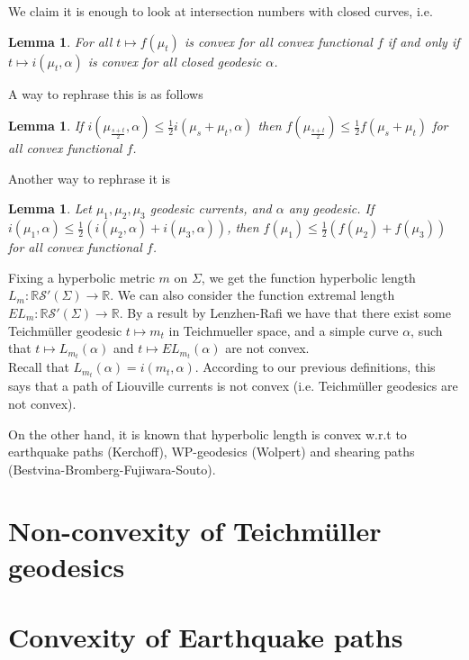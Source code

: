 \documentclass[12pt]{amsart}
\numberwithin{equation}{section}
\numberwithin{figure}{section}
\newtheorem{lemma}[theorem]{Lemma}
\theoremstyle{definition}
\begin{document}
We claim it is enough to look at intersection numbers with closed curves, i.e.

\begin{lemma}
For all $t \mapsto f(\mu_t)$ is convex for all convex functional $f$ if and only if $t \mapsto i(\mu_t,\alpha)$ is convex for all closed geodesic $\alpha$.
\end{lemma}

A way to rephrase this is as follows

\begin{lemma}
 If $ i(\mu_{\frac{s+t}{2}},\alpha) \leq \frac{1}{2} i(\mu_{s}+\mu_{t},\alpha) $ then $ f(\mu_{\frac{s+t}{2}}) \leq \frac{1}{2} f(\mu_{s}+\mu_{t})$ for all convex functional $f$.
\end{lemma}

Another way to rephrase it is

\begin{lemma}
 Let $\mu_1,\mu_2,\mu_3$ geodesic currents, and $\alpha$ any geodesic.
 If $ i(\mu_1, \alpha) \leq \frac{1}{2}(i(\mu_2, \alpha)+i(\mu_3, \alpha))$, then $f(\mu_1) \leq \frac{1}{2} (f(\mu_2)+f(\mu_3))$ for all convex functional $f$.
\end{lemma}

Fixing a hyperbolic metric $m$ on $\Sigma$, we get the function hyperbolic length $L_m\colon \mathbb{R}\mathcal{S}'(\Sigma) \to \mathbb{R}$.
We can also consider the function extremal length
$EL_m\colon \mathbb{R}\mathcal{S}'(\Sigma) \to \mathbb{R}$.
By a result by Lenzhen-Rafi we have that there exist some Teichm\"uller geodesic $t \mapsto m_t$ in Teichmueller space, and a simple curve $\alpha$, such that  $t \mapsto L_{m_t}(\alpha)$  and  $t \mapsto EL_{m_t}(\alpha)$  are not convex. \\
Recall that $L_{m_t}(\alpha)=i(m_t,\alpha)$. According to our previous definitions, this says that a path of Liouville currents is not convex (i.e. Teichm\"uller geodesics are not convex).

On the other hand, it is known that hyperbolic length is convex w.r.t to earthquake paths (Kerchoff), WP-geodesics (Wolpert) and shearing paths (Bestvina-Bromberg-Fujiwara-Souto).

\section{Non-convexity of Teichm\"uller geodesics}



\section{Convexity of Earthquake paths}
\end{document}
